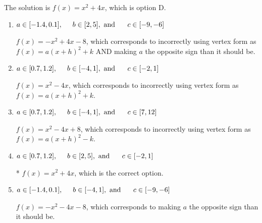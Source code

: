 \documentclass{extbook}[14pt]
\begin{document}
\begin{enumerate}
{The solution is \( f(x) = x^{2} +4 x \), which is option D.\begin{enumerate}[label=\Alph*.]
\item \( a \in [-1.4, 0.1], \hspace*{5mm} b \in [2, 5], \text{ and } \hspace*{5mm} c \in [-9, -6] \)

$f(x)=-x^{2} +4 x -8$, which corresponds to incorrectly using vertex form as $f(x) = a(x+h)^2+k$ AND making $a$ the opposite sign than it should be.
\item \( a \in [0.7, 1.2], \hspace*{5mm} b \in [-4, 1], \text{ and } \hspace*{5mm} c \in [-2, 1] \)

$f(x)=x^{2} -4 x$, which corresponds to incorrectly using vertex form as $f(x) = a(x+h)^2+k$.
\item \( a \in [0.7, 1.2], \hspace*{5mm} b \in [-4, 1], \text{ and } \hspace*{5mm} c \in [7, 12] \)

$f(x)=x^{2} -4 x + 8$, which corresponds to incorrectly using vertex form as $f(x) = a(x+h)^2 - k$.
\item \( a \in [0.7, 1.2], \hspace*{5mm} b \in [2, 5], \text{ and } \hspace*{5mm} c \in [-2, 1] \)

* $f(x)=x^{2} +4 x$, which is the correct option.
\item \( a \in [-1.4, 0.1], \hspace*{5mm} b \in [-4, 1], \text{ and } \hspace*{5mm} c \in [-9, -6] \)

$f(x)=-x^{2} -4 x -8$, which corresponds to making $a$ the opposite sign than it should be.
\end{enumerate}

}
\end{enumerate}
\end{document}
